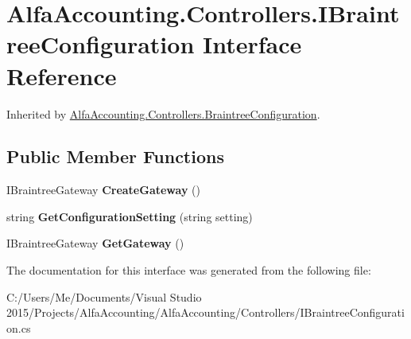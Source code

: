 \hypertarget{interface_alfa_accounting_1_1_controllers_1_1_i_braintree_configuration}{}\section{Alfa\+Accounting.\+Controllers.\+I\+Braintree\+Configuration Interface Reference}
\label{interface_alfa_accounting_1_1_controllers_1_1_i_braintree_configuration}


Inherited by \hyperlink{class_alfa_accounting_1_1_controllers_1_1_braintree_configuration}{Alfa\+Accounting.\+Controllers.\+Braintree\+Configuration}.

\subsection*{Public Member Functions}
\begin{DoxyCompactItemize}
\item 
\mbox{\label{interface_alfa_accounting_1_1_controllers_1_1_i_braintree_configuration_aaffc833ed3819c56bbe0b216f79d2970}} 
I\+Braintree\+Gateway {\bfseries Create\+Gateway} ()
\item 
\mbox{\label{interface_alfa_accounting_1_1_controllers_1_1_i_braintree_configuration_a0957dbe57696ea0b8aaa88d54d54310f}} 
string {\bfseries Get\+Configuration\+Setting} (string setting)
\item 
\mbox{\label{interface_alfa_accounting_1_1_controllers_1_1_i_braintree_configuration_ad3ecfbcefc60dd0bb6dfe7610c0d5b61}} 
I\+Braintree\+Gateway {\bfseries Get\+Gateway} ()
\end{DoxyCompactItemize}


The documentation for this interface was generated from the following file\+:\begin{DoxyCompactItemize}
\item 
C\+:/\+Users/\+Me/\+Documents/\+Visual Studio 2015/\+Projects/\+Alfa\+Accounting/\+Alfa\+Accounting/\+Controllers/I\+Braintree\+Configuration.\+cs\end{DoxyCompactItemize}
